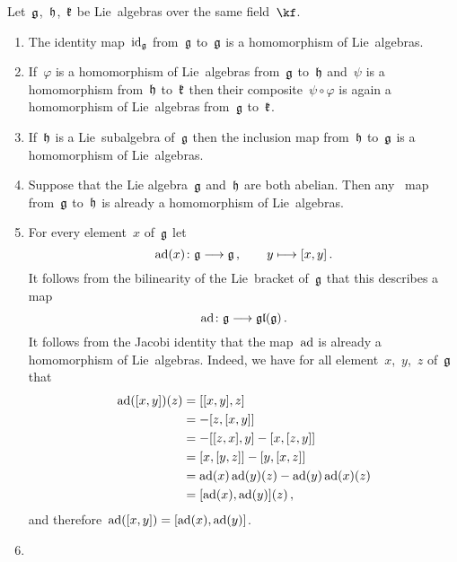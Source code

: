 \begin{examples}
  \label{homomorphisms of lie algebras}
  Let~$\mathfrak{g}$,~$\mathfrak{h}$,~$\mathfrak{k}$ be Lie~algebras over the same field~$\kf$.
  \begin{enumerate}
    \item
      \label{identity is a homomorphism of lie algebras}
      The identity map~$\mathrm{id}_{\mathfrak{g}}$ from~$\mathfrak{g}$ to~$\mathfrak{g}$ is a homomorphism of Lie~algebras.
    \item
      \label{composite of homomorphisms of lie algebras}
      If~$\varphi$ is a homomorphism of Lie~algebras from~$\mathfrak{g}$ to~$\mathfrak{h}$ and~$\psi$ is a homomorphism from~$\mathfrak{h}$ to~$\mathfrak{k}$ then their composite~$\psi \circ \varphi$ is again a homomorphism of Lie~algebras from~$\mathfrak{g}$ to~$\mathfrak{k}$.
    \item
      If~$\mathfrak{h}$ is a Lie~subalgebra of~$\mathfrak{g}$ then the inclusion map from~$\mathfrak{h}$ to~$\mathfrak{g}$ is a homomorphism of Lie~algebras.
    \item
      Suppose that the Lie algebra~$\mathfrak{g}$ and~$\mathfrak{h}$ are both abelian.
      Then any~\linear{$\kf$} map from~$\mathfrak{g}$ to~$\mathfrak{h}$ is already a homomorphism of Lie~algebras.
    \item
      For every element~$x$ of~$\mathfrak{g}$ let
      \[
        \ad(x)
        \colon
        \glie
        \to
        \glie \,,
        \qquad
        y
        \mapsto
        [x,y] \,.
        \index{adjoint representation}
      \]
      It follows from the bilinearity of the Lie~bracket of~$\mathfrak{g}$ that this describes a~\linear{$\kf$} map
      \[
        \ad
        \colon
        \glie
        \to
        \gllie(\glie) \,.
      \]
      It follows from the Jacobi identity that the map~$\operatorname{ad}$ is already a homomorphism of Lie~algebras.
      Indeed, we have for all element~$x$,~$y$,~$z$ of~$\mathfrak{g}$ that
      \begin{align*}
          \operatorname{ad}([x,y])(z)
          &=
          [[x,y], z]
          \\
          &=
          - [z, [x,y]]
          \\
          &=
          - [[z,x], y] - [x, [z,y]]
          \\
          &=
          [x, [y,z]] - [y, [x,z]]
          \\
          &=
          \operatorname{ad}(x)\operatorname{ad}(y)(z) - \operatorname{ad}(y)\operatorname{ad}(x)(z)
          \\
          &=
          [\operatorname{ad}(x), \operatorname{ad}(y)](z) \,,
      \end{align*}
      and therefore~$\operatorname{ad}([x,y]) = [ \operatorname{ad}(x), \operatorname{ad}(y) ]$.
    \item

\end{enumerate}
\end{examples}

